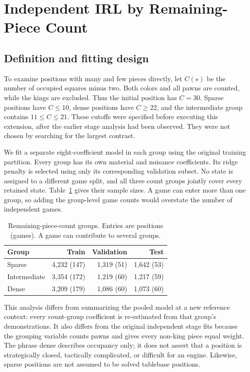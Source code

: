 \documentclass{jcst}
\begin{document}
\section{Independent IRL by Remaining-Piece Count}
\subsection{Definition and fitting design}
To examine positions with many and few pieces directly, let $C(s)$ be the number of occupied squares minus two. Both colors and all pawns are counted, while the kings are excluded. Thus the initial position has $C=30$. Sparse positions have $C\leq10$, dense positions have $C\geq22$, and the intermediate group contains $11\leq C\leq21$. These cutoffs were specified before executing this extension, after the earlier stage analysis had been observed. They were not chosen by searching for the largest contrast.

We fit a separate eight-coefficient model in each group using the original training partition. Every group has its own material and nuisance coefficients. Its ridge penalty is selected using only its corresponding validation subset. No state is assigned to a different game split, and all three count groups jointly cover every retained state. Table~\ref{tab:countcoverage} gives their sample sizes. A game can enter more than one group, so adding the group-level game counts would overstate the number of independent games.
\begin{table}[t]\centering
\small
\caption{Remaining-piece-count groups. Entries are positions (games). A game can contribute to several groups.}\label{tab:countcoverage}
\begin{tabular}{lrrr}
\toprule
Group & Train & Validation & Test\\\midrule
Sparse & 4,232 (147) & 1,319 (51) & 1,642 (53)\\
Intermediate & 3,354 (172) & 1,219 (60) & 1,217 (59)\\
Dense & 3,209 (179) & 1,086 (60) & 1,073 (60)\\
\bottomrule\end{tabular}\end{table}

This analysis differs from summarizing the pooled model at a new reference context: every count-group coefficient is re-estimated from that group's demonstrations. It also differs from the original independent stage fits because the grouping variable counts pawns and gives every non-king piece equal weight. The phrase dense describes occupancy only; it does not assert that a position is strategically closed, tactically complicated, or difficult for an engine. Likewise, sparse positions are not assumed to be solved tablebase positions.
\end{document}

